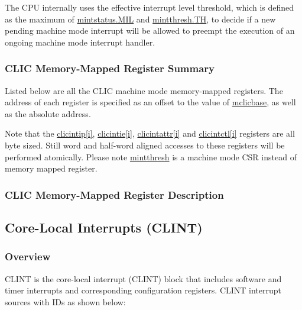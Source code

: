 \documentclass[main\_\_EN.tex]{subfiles}
\begin{document}
The CPU internally uses the effective interrupt level threshold, which is defined as the maximum of \hyperref[fielddesc:MINTSTATUS_MIL]{{mintstatus.MIL}} and \hyperref[fielddesc:MINTTHRESH_TH]{{mintthresh.TH}}, to decide if a new pending machine mode interrupt will be allowed to preempt the execution of an ongoing machine mode interrupt handler.


\hypertarget{riscvcpu-clic-memmap-reg-summ}{}
\subsubsection{CLIC Memory-Mapped Register Summary}
\label{sec:riscvcpu-clic-memmap-reg-summ}

Listed below are all the CLIC machine mode memory-mapped registers. The address of each register is specified as an offset to the value of  \hyperref[fielddesc:MCLICBASE]{mclicbase}, as well as the absolute address.

Note that the \hyperref[regdesc:MCLICINTIP_REG_i]{clicintip[i]}, \hyperref[regdesc:MCLICINTIE_REG_i]{clicintie[i]}, \hyperref[regdesc:MCLICINTATTR_REG_i]{clicintattr[i]} and \hyperref[regdesc:MCLICINTCTL_REG_i]{clicintctl[i]} registers are all byte sized. Still word and half-word aligned accesses to these registers will be performed atomically. Please note \hyperref[regdesc:MINTTHRESH]{mintthresh} is a machine mode CSR instead of memory mapped register.





\hypertarget{riscvcpu-clic-memmap-reg}{}
\subsubsection{CLIC Memory-Mapped Register Description}
\label{sec:riscvcpu-clic-memmap-reg}



\newpage
\subsection{Core-Local Interrupts (CLINT)}
\label{sec:riscvcpu-clint}
\subsubsection{Overview}
\label{sec:riscvcpu-clint-overview}
CLINT is the core-local interrupt (CLINT) block that includes software and timer interrupts and corresponding configuration registers. CLINT interrupt sources with IDs as shown below:
\end{document}
